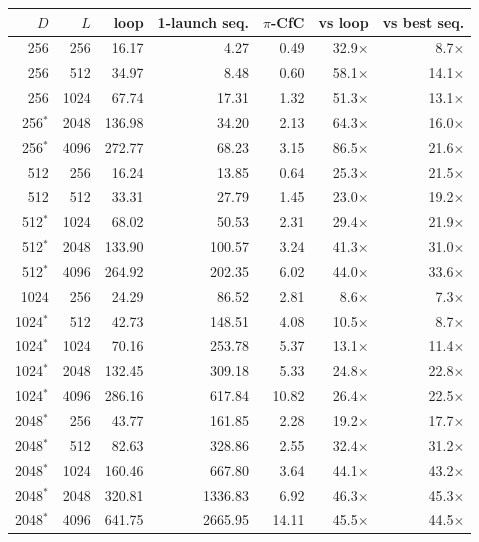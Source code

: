 \begin{tabular}{rrrrrrr}
\toprule
$D$ & $L$ & loop & 1-launch seq. & $\pi$-CfC & vs loop & vs best seq. \\
\midrule
256 & 256 & 16.17 & 4.27 & 0.49 & 32.9$\times$ & 8.7$\times$ \\
256 & 512 & 34.97 & 8.48 & 0.60 & 58.1$\times$ & 14.1$\times$ \\
256 & 1024 & 67.74 & 17.31 & 1.32 & 51.3$\times$ & 13.1$\times$ \\
256$^{*}$ & 2048 & 136.98 & 34.20 & 2.13 & 64.3$\times$ & 16.0$\times$ \\
256$^{*}$ & 4096 & 272.77 & 68.23 & 3.15 & 86.5$\times$ & 21.6$\times$ \\
512 & 256 & 16.24 & 13.85 & 0.64 & 25.3$\times$ & 21.5$\times$ \\
512 & 512 & 33.31 & 27.79 & 1.45 & 23.0$\times$ & 19.2$\times$ \\
512$^{*}$ & 1024 & 68.02 & 50.53 & 2.31 & 29.4$\times$ & 21.9$\times$ \\
512$^{*}$ & 2048 & 133.90 & 100.57 & 3.24 & 41.3$\times$ & 31.0$\times$ \\
512$^{*}$ & 4096 & 264.92 & 202.35 & 6.02 & 44.0$\times$ & 33.6$\times$ \\
1024 & 256 & 24.29 & 86.52 & 2.81 & 8.6$\times$ & 7.3$\times$ \\
1024$^{*}$ & 512 & 42.73 & 148.51 & 4.08 & 10.5$\times$ & 8.7$\times$ \\
1024$^{*}$ & 1024 & 70.16 & 253.78 & 5.37 & 13.1$\times$ & 11.4$\times$ \\
1024$^{*}$ & 2048 & 132.45 & 309.18 & 5.33 & 24.8$\times$ & 22.8$\times$ \\
1024$^{*}$ & 4096 & 286.16 & 617.84 & 10.82 & 26.4$\times$ & 22.5$\times$ \\
2048$^{*}$ & 256 & 43.77 & 161.85 & 2.28 & 19.2$\times$ & 17.7$\times$ \\
2048$^{*}$ & 512 & 82.63 & 328.86 & 2.55 & 32.4$\times$ & 31.2$\times$ \\
2048$^{*}$ & 1024 & 160.46 & 667.80 & 3.64 & 44.1$\times$ & 43.2$\times$ \\
2048$^{*}$ & 2048 & 320.81 & 1336.83 & 6.92 & 46.3$\times$ & 45.3$\times$ \\
2048$^{*}$ & 4096 & 641.75 & 2665.95 & 14.11 & 45.5$\times$ & 44.5$\times$ \\
\bottomrule
\end{tabular}
